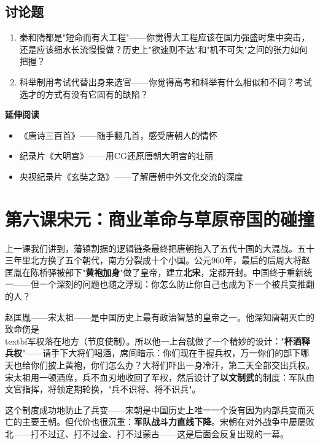 \documentclass[a4paper,12pt]{ctexart}
\begin{document}
\subsection*{讨论题}
\begin{enumerate}
  \item 秦和隋都是"短命而有大工程"——你觉得大工程应该在国力强盛时集中突击，还是应该细水长流慢慢做？历史上"欲速则不达"和"机不可失"之间的张力如何把握？
  \item 科举制用考试代替出身来选官——你觉得高考和科举有什么相似和不同？考试选才的方式有没有它固有的缺陷？
\end{enumerate}

\vspace{0.3cm}
\textcolor{blue!70!black}{\textbf{延伸阅读}}
\begin{itemize}
  \item 《唐诗三百首》——随手翻几首，感受唐朝人的情怀
  \item 纪录片《大明宫》——用CG还原唐朝大明宫的壮丽
  \item 央视纪录片《玄奘之路》——了解唐朝中外文化交流的深度
\end{itemize}

\newpage

\section{\textcolor{orange!80!black}{第六课\quad 宋元：商业革命与草原帝国的碰撞}}

上一课我们讲到，藩镇割据的逻辑链条最终把唐朝拖入了五代十国的大混战。五十三年里北方换了五个朝代，南方分裂成十个小国。公元960年，最后的后周大将赵匡胤在陈桥驿被部下"\textbf{黄袍加身}"做了皇帝，建立\textbf{北宋}，定都开封。中国终于重新统一——但一个深刻的问题也随之浮现：你怎么防止你自己也成为下一个被兵变推翻的人？

赵匡胤——宋太祖——是中国历史上最有政治智慧的皇帝之一。他深知唐朝灭亡的致命伤是\\textbf{军权落在地方}（节度使制）。所以他一上台就做了一个精妙的设计："\textbf{杯酒释兵权}"——请手下大将们喝酒，席间暗示：你们现在手握兵权，万一你们的部下哪天也给你们披上黄袍，你们怎么办？大将们吓出一身冷汗，第二天全部交出兵权。宋太祖用一顿酒席，兵不血刃地收回了军权，然后设计了\textbf{以文制武}的制度：军队由文官指挥，将领定期轮换，"兵不识将、将不识兵"。

这个制度成功地防止了兵变——宋朝是中国历史上唯一一个没有因为内部兵变而灭亡的主要王朝。但代价也很沉重：\textbf{军队战斗力直线下降}。宋朝在对外战争中屡屡败北——打不过辽、打不过金、打不过蒙古——这是后面会反复出现的一幕。
\end{document}
